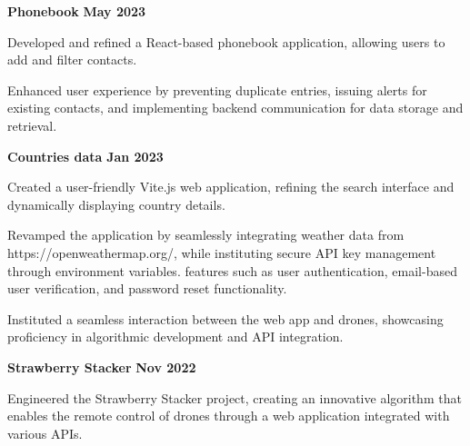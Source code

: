 \documentclass[a4paper,10pt]{article}
\begin{document}
\begin{itemize*}
  \setlength{\itemsep}{1pt}
  \item \textbf{\small{Phonebook}} \hfill {\small{{\textbf{May 2023}}}\/}
  \begin{itemize*}
    \item Developed and refined a React-based phonebook application, allowing users to add and filter contacts.
    \item Enhanced user experience by preventing duplicate entries, issuing alerts for existing contacts, and implementing backend communication for data storage and retrieval.
  \end{itemize*}
\end{itemize*}

\begin{itemize*}
  \setlength{\itemsep}{1pt}
  \item \textbf{\small{Countries data}} \hfill {\small{{\textbf{Jan 2023}}}\/}
  \begin{itemize*}
    \item Created a user-friendly Vite.js web application, refining the search interface and dynamically displaying country details.
  \end{itemize*}
  \begin{itemize*}
    \item Revamped the application by seamlessly integrating weather data from https://openweathermap.org/, while instituting secure API key management through environment variables.
    features such as user authentication, email-based user verification, and password reset functionality.
    \item Instituted a seamless interaction between the web app and drones, showcasing proficiency in algorithmic
development and API integration.
  \end{itemize*}
\end{itemize*}

\begin{itemize*}
  \setlength{\itemsep}{1pt}
  \item \textbf{\small{Strawberry Stacker}} \hfill {\small{{\textbf{Nov 2022}}}\/}
  \begin{itemize*}
    \item     Engineered the Strawberry Stacker project, creating an innovative algorithm that enables the remote control of drones through a web application integrated with various APIs.
  \end{itemize*}
\end{itemize*}
\end{document}
